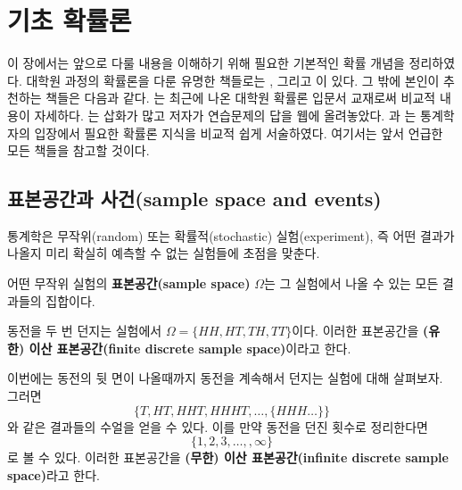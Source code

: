 \documentclass[b5paper,]{scrbook}
\theoremstyle{plain}
\theoremstyle{definition}
\numberwithin{equation}{section}
\let\BeginKnitrBlock\begin \let\EndKnitrBlock\end
\begin{document}
\hypertarget{basicprob}{%
\chapter{기초 확률론}\label{basicprob}}

이 장에서는 앞으로 다룰 내용을 이해하기 위해 필요한 기본적인 확률 개념을 정리하였다. 대학원 과정의 확률론을 다룬 유명한 책들로는 \citep{Durrett2010}, \citep{Billingsley2012} 그리고 \citep{Chung2001}이 있다. 그 밖에 본인이 추천하는 책들은 다음과 같다. \citep{Gut2012}는 최근에 나온 대학원 확률론 입문서 교재로써 비교적 내용이 자세하다. \citep{Schilling2005}는 삽화가 많고 저자가 연습문제의 답을 웹에 올려놓았다. \citep{Shorack2006}과 \citep{Proschan2016}는 통계학자의 입장에서 필요한 확률론 지식을 비교적 쉽게 서술하였다. 여기서는 앞서 언급한 모든 책들을 참고할 것이다.

\hypertarget{-sample-space-and-events}{%
\section{표본공간과 사건(sample space and events)}\label{-sample-space-and-events}}

통계학은 무작위(random) 또는 확률적(stochastic) 실험(experiment), 즉 어떤 결과가 나올지 미리 확실히 예측할 수 없는 실험들에 초점을 맞춘다.

\BeginKnitrBlock{definition}[표본공간]
\protect\hypertarget{def:unnamed-chunk-63}{}{\label{def:unnamed-chunk-63} {} }어떤 무작위 실험의 \textbf{표본공간(sample space)} \(\Omega\)는 그 실험에서 나올 수 있는 모든 결과들의 집합이다.
\EndKnitrBlock{definition}

\BeginKnitrBlock{example}[동전 던지기 실험]
\protect\hypertarget{exm:unnamed-chunk-64}{}{\label{exm:unnamed-chunk-64} {} }동전을 두 번 던지는 실험에서 \(\Omega=\{ HH, HT, TH, TT \}\)이다. 이러한 표본공간을 \textbf{(유한) 이산 표본공간(finite discrete sample space)}이라고 한다.
\EndKnitrBlock{example}

\BeginKnitrBlock{example}[동전 계속 던지기 실험]
\protect\hypertarget{exm:unnamed-chunk-65}{}{\label{exm:unnamed-chunk-65} {} }이번에는 동전의 뒷 면이 나올때까지 동전을 계속해서 던지는 실험에 대해 살펴보자. 그러면
\[\{ T, HT, HHT, HHHT, \ldots, \{ HHH\ldots\} \}\]
와 같은 결과들의 수얼을 얻을 수 있다. 이를 만약 동전을 던진 횟수로 정리한다면
\[\{ 1,2,3,\ldots, ,\infty\}\]
로 볼 수 있다. 이러한 표본공간을 \textbf{(무한) 이산 표본공간(infinite discrete sample space)}라고 한다.
\EndKnitrBlock{example}
\end{document}
